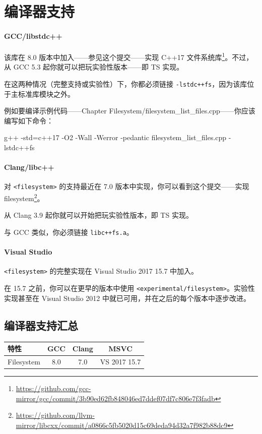 \section{编译器支持}

\paragraph{GCC/libstdc++}

该库在 8.0 版本中加入——参见这个提交——实现 C++17 文件系统库\footnote{\url{https://github.com/gcc-mirror/gcc/commit/3b90ed62fb848046ed7ddef07df7c806e7f3fadb}}。不过，从 GCC 5.3 起你就可以把玩实验性版本——即 TS 实现。

在这两种情况（完整支持或实验性）下，你都必须链接 \texttt{-lstdc++fs}，因为该库位于主标准库模块之外。

例如要编译示例代码——Chapter Filesystem/filesystem\_list\_files.cpp——你应该编写如下命令：

\begin{codebox}[text]
g++ -std=c++17 -O2 -Wall -Werror -pedantic filesystem_list_files.cpp -lstdc++fs
\end{codebox}

\paragraph{Clang/libc++}

对 \texttt{<filesystem>} 的支持最近在 7.0 版本中实现，你可以看到这个提交——实现 filesystem\footnote{\url{https://github.com/llvm-mirror/libcxx/commit/a0866c5fb5020d15c69deda94d32a7f982b88dc9}}。

从 Clang 3.9 起你就可以开始把玩实验性版本，即 TS 实现。

与 GCC 类似，你必须链接 \texttt{libc++fs.a}。

\paragraph{Visual Studio}

\texttt{<filesystem>} 的完整实现在 Visual Studio 2017 15.7 中加入。

在 15.7 之前，你可以在更早的版本中使用 \texttt{<experimental/filesystem>}。实验性实现甚至在 Visual Studio 2012 中就已可用，并在之后的每个版本中逐步改进。

\subsection{编译器支持汇总}

\begin{table}[H]
\centering
\begin{tabularx}{\textwidth}{X c c c}
\toprule
特性 & GCC & Clang & MSVC \\
\midrule
Filesystem & 8.0 & 7.0 & VS 2017 15.7 \\
\bottomrule
\end{tabularx}
\end{table}
